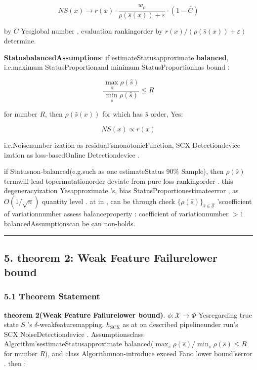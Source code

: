 \documentclass[
  12pt,
]{article}
\begin{document}
\[NS(x) \to r(x) \cdot \frac{w_\rho}{\rho(\hat{s}(x)) + \varepsilon} \cdot (1 - \bar{C})\]

by  \(\bar{C}\) Yesglobal number , evaluation rankingorder by 
\(r(x) / (\rho(\hat{s}(x)) + \varepsilon)\) determine. 

\textbf{StatusbalancedAssumptions}: if estimateStatusapproximate \textbf{balanced}, i.e.maximum StatusProportionand minimum StatusProportionhas bound : 

\[\frac{\max_{\hat{s}} \rho(\hat{s})}{\min_{\hat{s}} \rho(\hat{s})} \leq R\]

for number  \(R\), then  \(\rho(\hat{s}(x))\) for which has  \(\hat{s}\) order, Yes: 

\[NS(x) \propto r(x)\]

i.e.Noisenumber ization as residual'smonotonicFunction, SCX Detectiondevice ization as loss-basedOnline Detectiondevice . 

if Statusnon-balanced(e.g.such as one estimateStatus 90\% Sample), then  \(\rho(\hat{s})\)
termwill lead topermutationorder deviate from pure loss rankingorder . this degeneracyization Yesapproximate 's, bias StatusProportionestimateerror , as 
\(O(1/\sqrt{n})\) quantity level . at in , can be through check
\(\{\rho(\hat{s})\}_{\hat{s} \in \hat{\mathcal{S}}}\)
'scoefficient of variationnumber assess balanceproperty : coefficient of variationnumber  \(> 1\) balancedAssumptionscan be can non-holds. 

\begin{center}\rule{0.5\linewidth}{0.5pt}\end{center}

\subsection{5. theorem 
2: Weak Feature Failurelower bound}\label{ux5b9aux7406-2ux5f31ux7279ux5f81ux5931ux8d25ux4e0bux754c}

\subsubsection{5.1 Theorem Statement}\label{ux5b9aux7406ux9648ux8ff0}

\textbf{theorem  2(Weak Feature Failurelower bound)}.  \(\phi: \mathcal{X} \to \Phi\)
Yesregarding true state \(S\) 's \(\delta\)-weakfeaturemapping.  \(h_{\text{SCX}}\)
as at on described pipelineunder run's SCX
NoiseDetectiondevice . Assumptionsclass Algorithm'sestimateStatusapproximate balanced(\(\max_{\hat{s}} \rho(\hat{s}) / \min_{\hat{s}} \rho(\hat{s}) \leq R\)
for number  \(R\)), and class Algorithmnon-introduce exceed Fano lower bound'serror . then : 
\end{document}
